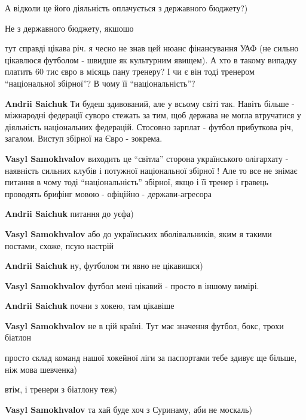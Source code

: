 \begin{itemize}
А відколи це його діяльність оплачується з державного бюджету?)

Не з державного бюджету, якшошо

\begin{itemize}

тут справді цікава річ. я чесно не знав цей нюанс фінансування УАФ (не сильно
цікавлюся футболом - швидше як культурним явищем). А хто в такому випадку
платить 60 тис євро в місяць пану тренеру? І чи є він тоді тренером
\enquote{національної збірної}? В чому її \enquote{національність}?

\textbf{Andrii Saichuk} Ти будеш здивований, але у всьому світі так. Навіть
більше - міжнародні федерації суворо стежать за тим, щоб держава не могла
втручатися у діяльність національних федерацій. Стосовно зарплат - футбол
прибуткова річ, загалом. Виступ збірної на Євро - зокрема.

\textbf{Vasyl Samokhvalov} виходить це \enquote{світла} сторона українського олігархату
- наявність сильних клубів і потужної національної збірної ! \Laughey[1.0] Але то все не
знімає питання в чому тоді \enquote{національність} збірної, якщо і її тренер і гравець
проводять брифінг мовою - офіційно - держави-агресора 🤷

\textbf{Andrii Saichuk} питання до уєфа)

\textbf{Vasyl Samokhvalov} або до українських вболівальників, яким я такими постами, схоже, псую настрій \Smiley[1.0][yellow]

\textbf{Andrii Saichuk} ну, футболом ти явно не цікавишся)

\textbf{Vasyl Samokhvalov} футбол мені цікавий - просто в іншому вимірі.

\textbf{Andrii Saichuk} почни з хокею, там цікавіше

\textbf{Vasyl Samokhvalov} не в цій країні. Тут має значення футбол, бокс, трохи біатлон

просто склад команд нашої хокейної ліги за паспортами тебе здивує ще більше, ніж мова шевченка)

втім, і тренери з біатлону теж)

\textbf{Vasyl Samokhvalov} та хай буде хоч з Суринаму, аби не москаль)


\end{itemize}
\end{itemize}
